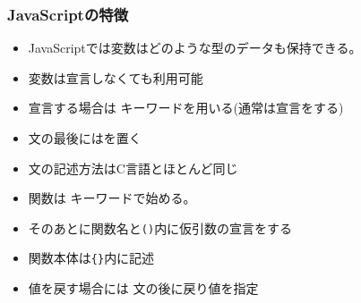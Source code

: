\begin{frame}[containsverbatim]
 \frametitle{JavaScriptの特徴}
 \begin{itemize}
  \item JavaScriptでは変数はどのような型のデータも保持できる。
  \item 変数は宣言しなくても利用可能
  \item 宣言する場合は  キーワードを用いる(通常は宣言をする)
  \item 文の最後には\JSKey{;}を置く
  \item 文の記述方法はC言語とほとんど同じ
  \item 関数は  キーワードで始める。
  \item そのあとに関数名と\texttt{()}内に仮引数の宣言をする
  \item 関数本体は\texttt{\{\}}内に記述
  \item 値を戻す場合には 文の後に戻り値を指定
 \end{itemize}
\end{frame}

